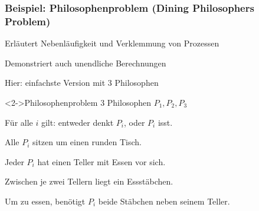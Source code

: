     \begin{frame}
      \frametitle{Beispiel: Philosophenproblem \hfill {\normalsize (Dining Philosophers Problem)}}

      Erläutert Nebenläufigkeit und Verklemmung von Prozessen

      \par\medskip
      Demonstriert auch unendliche Berechnungen

      \par\medskip
      Hier: einfachste Version mit 3 Philosophen

      \begin{exampleblock}<2->{Philosophenproblem}
        3 Philosophen $P_1,P_2,P_3$

        \par\medskip
        Für alle $i$ gilt: entweder denkt $P_i$, oder $P_i$ isst.

        \par\medskip
        Alle $P_i$ sitzen um einen runden Tisch.

        \par\medskip
        Jeder $P_i$ hat einen Teller mit Essen vor sich.

        \par\medskip
        Zwischen je zwei Tellern liegt ein Essstäbchen.

        \par\medskip
        Um zu essen, benötigt $P_i$ beide Stäbchen neben seinem Teller.

        \par\medskip
      \end{exampleblock}
    \end{frame}

